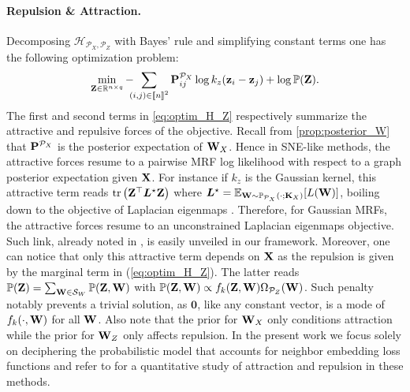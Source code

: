 \paragraph{Repulsion \& Attraction.}
Decomposing $\mathcal{H}_{\mathcal{P}_X, \mathcal{P}_Z}$ with Bayes' rule and simplifying constant terms one has the following optimization problem: 
\begin{align}\label{eq:optim_H_Z}
    \min_{\Zb \in \mathbb{R}^{n \times q}} -\hspace{-0.2cm}\sum_{(i,j) \in \integ{n}^2} \Pb^{\mathcal{P}_X}_{ij}\log k_z(\mathbf{z}_{i} - \mathbf{z}_{j}) + \log \mathbb{P}(\Zb).
\end{align}
The first and second terms in \cref{eq:optim_H_Z} respectively summarize the attractive and repulsive forces of the objective. Recall from \cref{prop:posterior_W}
that $\mathbf{P}^{\mathcal{P}_X}$ is the posterior expectation of $\mathbf{W}_{X}$. Hence in SNE-like methods, the attractive forces resume to a pairwise MRF log likelihood with respect to a graph posterior expectation given $\mathbf{X}$. For instance if $k_z$ is the Gaussian kernel, this attractive term reads $\operatorname{tr} \left(\mathbf{Z}^\top \bm{L}^\star \mathbf{Z} \right)$ where $\bm{L}^\star = \mathbb{E}_{\mathbf{W} \sim \mathbb{P}_{\mathcal{P}_X}(\cdot;\mathbf{K}_{X})}[L(\mathbf{W})]$, boiling down to the objective of Laplacian eigenmaps \cite{belkin2003laplacian}. Therefore, for Gaussian MRFs, the attractive forces resume to an unconstrained Laplacian eigenmaps objective. Such link, already noted in \cite{carreira2010elastic}, is easily unveiled in our framework. Moreover, one can notice that only this attractive term depends on $\mathbf{X}$ as the repulsion is given by the marginal term in (\ref{eq:optim_H_Z}). The latter reads $\mathbb{P}(\mathbf{Z}) = \sum_{\mathbf{W} \in \mathcal{S}_{W}} \mathbb{P}(\mathbf{Z}, \mathbf{W})$ with $\mathbb{P}(\mathbf{Z}, \mathbf{W}) \propto f_k(\mathbf{Z}, \mathbf{W})\Omega_{\mathcal{P}_Z}(\mathbf{W})$. Such penalty notably prevents a trivial solution, as $\bm{0}$, like any constant vector, is a mode of $f_k(\cdot, \mathbf{W})$ for all $\mathbf{W}$. Also note that the prior for $\mathbf{W}_{X}$ only conditions attraction while the prior for $\mathbf{W}_{Z}$ only affects repulsion. In the present work we focus solely on deciphering the probabilistic model that accounts for neighbor embedding loss functions and refer to \cite{bohm2020unifying} for a quantitative study of attraction and repulsion in these methods.

